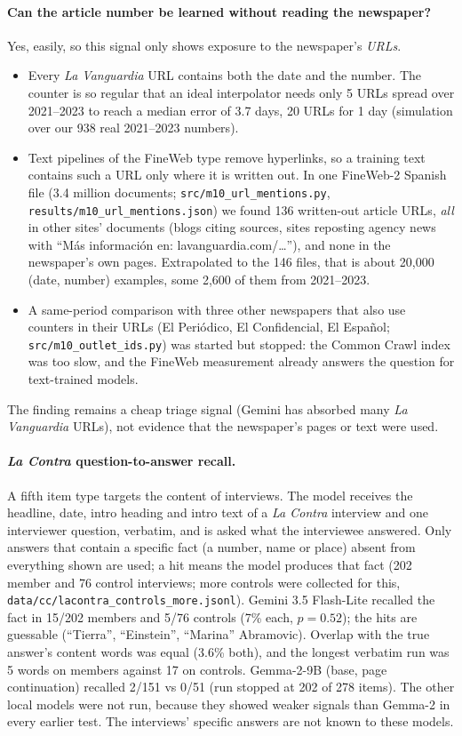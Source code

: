 \documentclass[10pt,a4paper]{article}
\begin{document}
\paragraph{Can the article number be learned without reading the newspaper?} Yes, easily, so this signal only shows
exposure to the newspaper's \emph{URLs}.
\begin{itemize}
\item Every \emph{La Vanguardia} URL contains both the date and the number. The counter is so regular that an ideal
interpolator needs only 5 URLs spread over 2021--2023 to reach a median error of 3.7 days, 20 URLs for 1 day
(simulation over our 938 real 2021--2023 numbers).
\item Text pipelines of the FineWeb type remove hyperlinks, so a training text contains such a URL only where it is
written out. In one FineWeb-2 Spanish file (3.4 million documents; \texttt{src/m10\_url\_mentions.py},
\texttt{results/m10\_url\_mentions.json}) we found 136 written-out article URLs, \emph{all} in other sites' documents
(blogs citing sources, sites reposting agency news with ``M\'as informaci\'on en: lavanguardia.com/\dots''), and none
in the newspaper's own pages. Extrapolated to the 146 files, that is about 20,000 (date, number) examples, some 2,600
of them from 2021--2023.
\item A same-period comparison with three other newspapers that also use counters in their URLs (El Peri\'odico,
El Confidencial, El Espa\~nol; \texttt{src/m10\_outlet\_ids.py}) was started but stopped: the Common Crawl index was too
slow, and the FineWeb measurement already answers the question for text-trained models.
\end{itemize}
The finding remains a cheap triage signal (Gemini has absorbed many \emph{La Vanguardia} URLs), not evidence that the
newspaper's pages or text were used.

\paragraph{\emph{La Contra} question-to-answer recall.} A fifth item type targets the content of interviews. The model
receives the headline, date, intro heading and intro text of a \emph{La Contra} interview and one interviewer
question, verbatim, and is asked what the interviewee answered. Only answers that contain a specific fact (a number, name or place)
absent from everything shown are used; a hit means the model produces that fact (202 member and 76 control
interviews; more controls were collected for this, \texttt{data/cc/lacontra\_controls\_more.jsonl}). Gemini 3.5
Flash-Lite recalled the fact in 15/202 members and 5/76 controls (7\% each, $p=0.52$); the hits are guessable
(``Tierra'', ``Einstein'', ``Marina'' Abramovic). Overlap with the true answer's content words was equal (3.6\% both),
and the longest verbatim run was 5 words on members against 17 on controls. Gemma-2-9B (base, page continuation) recalled
2/151 vs 0/51 (run stopped at 202 of 278 items). The other local models were not run, because they showed weaker signals than Gemma-2 in every earlier
test. The interviews' specific answers are not known to these models.
\end{document}
